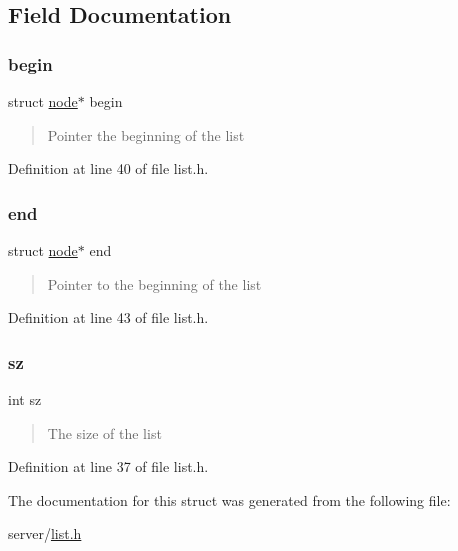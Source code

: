 \subsection{Field Documentation}
\mbox{\label{structlist_a4608ed60ff5a6f2ada6dc6e4744c299f}} 
\subsubsection{\texorpdfstring{begin}{begin}}
{\footnotesize\ttfamily struct \hyperlink{structnode}{node}$\ast$ begin}



\begin{quote}
Pointer the beginning of the list \end{quote}




Definition at line 40 of file list.\+h.

\mbox{\label{structlist_a8a6d5d9008d8b6eac4a8edb8fbb1f191}} 
\subsubsection{\texorpdfstring{end}{end}}
{\footnotesize\ttfamily struct \hyperlink{structnode}{node}$\ast$ end}



\begin{quote}
Pointer to the beginning of the list \end{quote}




Definition at line 43 of file list.\+h.

\mbox{\label{structlist_a0e1ea19fb9fa7881d15d84eff4c090e1}} 
\subsubsection{\texorpdfstring{sz}{sz}}
{\footnotesize\ttfamily int sz}



\begin{quote}
The size of the list \end{quote}




Definition at line 37 of file list.\+h.



The documentation for this struct was generated from the following file\+:\begin{DoxyCompactItemize}
\item 
server/\hyperlink{list_8h}{list.\+h}\end{DoxyCompactItemize}
